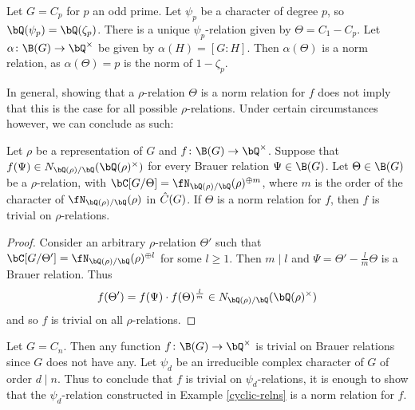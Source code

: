 
\begin{example}
    Let $G = C_p$ for $p$ an odd prime. Let $\psi_p$ be a character of degree $p$, so $\bQ(\psi_p) = \bQ(\zeta_p)$. There is a unique $\psi_p$-relation given by $\Theta = C_1 - C_p$. Let $\alpha \colon \B(G) \to \bQ^{\times}$ be given by $\alpha(H) = [G \colon H]$. Then $\alpha(\Theta)$ is a norm relation, as $\alpha(\Theta) = p$ is the norm of $1 - \zeta_p$.
\end{example}

In general, showing that a $\rho$-relation $\Theta$ is a norm relation for $f$ does not imply that this is the case for all possible $\rho$-relations. Under certain circumstances however, we can conclude as such:

\begin{prop}\label{min-to-all}
    Let $\rho$ be a representation of $G$ and $f \colon \B(G) \to \bQ^{\times}$. Suppose that $f(\Psi) \in \fieldnorm{\rho}$ for every Brauer relation $\Psi \in \B(G)$. 
    Let $\Theta \in \B(G)$ be a $\rho$-relation, with $\bC[G / \Theta] = \repnorm{\rho}^{\oplus m}$, where $m$ is the order of the character of $\repnorm{\rho}$ in $\hat{C}(G)$. 
    If $\Theta$ is a norm relation for $f$, then $f$ is trivial on $\rho$-relations. 
\end{prop}

\begin{proof}
    Consider an arbitrary $\rho$-relation $\Theta'$ such that $\bC[G / \Theta'] = \repnorm{\rho}^{\oplus l}$ for some $l \geq 1$. Then $m \mid l$ and $\Psi = \Theta' - \frac{l}{m}\Theta$ is a Brauer relation. Thus
    \[ f(\Theta') = f(\Psi)\cdot f(\Theta)^{\frac{l}{m}} \in \fieldnorm{\rho} \]
    and so $f$ is trivial on all $\rho$-relations.
\end{proof}

\begin{example}
    Let $G = C_n$. Then any function $f \colon \B(G) \to \bQ^{\times}$ is trivial on Brauer relations since $G$ does not have any. Let $\psi_d$ be an irreducible complex character of $G$ of order $d \mid n$. Thus to conclude that $f$ is trivial on $\psi_d$-relations, it is enough to show that the $\psi_d$-relation constructed in Example \ref{cyclic-relns} is a norm relation for $f$.
\end{example}


